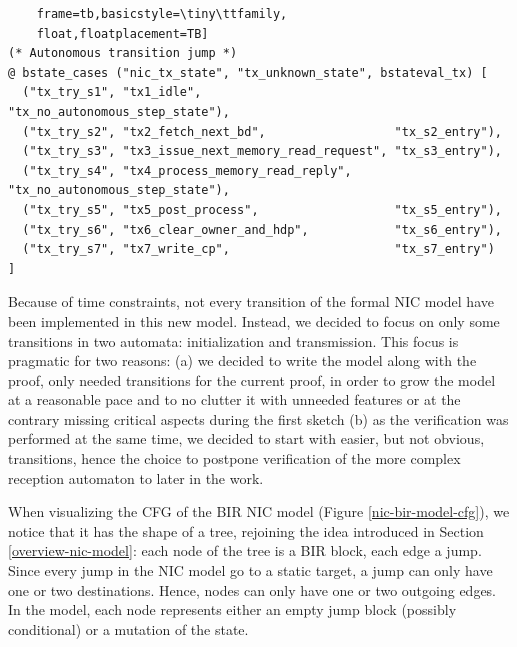 \documentclass{kththesis}
\begin{document}
{\begin{lstlisting}
    frame=tb,basicstyle=\tiny\ttfamily,
    float,floatplacement=TB]
(* Autonomous transition jump *)
@ bstate_cases ("nic_tx_state", "tx_unknown_state", bstateval_tx) [
  ("tx_try_s1", "tx1_idle",                           "tx_no_autonomous_step_state"),
  ("tx_try_s2", "tx2_fetch_next_bd",                  "tx_s2_entry"),
  ("tx_try_s3", "tx3_issue_next_memory_read_request", "tx_s3_entry"),
  ("tx_try_s4", "tx4_process_memory_read_reply",      "tx_no_autonomous_step_state"),
  ("tx_try_s5", "tx5_post_process",                   "tx_s5_entry"),
  ("tx_try_s6", "tx6_clear_owner_and_hdp",            "tx_s6_entry"),
  ("tx_try_s7", "tx7_write_cp",                       "tx_s7_entry")
]
\end{lstlisting}
%
Because of time constraints, not every transition of the formal NIC model have been implemented in this new model. Instead, we decided to focus on only some transitions in two automata: initialization and transmission. This focus is pragmatic for two reasons: (a) we decided to write the model along with the proof, only needed transitions for the current proof, in order to grow the model at a reasonable pace and to no clutter it with unneeded features or at the contrary missing critical aspects during the first sketch (b) as the verification was performed at the same time, we decided to start with easier, but not obvious, transitions, hence the choice to postpone verification of the more complex reception automaton to later in the work.

When visualizing the \gls{CFG} of the BIR NIC model (Figure \ref{nic-bir-model-cfg}), we notice that it has the shape of a tree, rejoining the idea introduced in Section \ref{overview-nic-model}: each node of the tree is a BIR block, each edge a jump. Since every jump in the NIC model go to a static target, a jump can only have one or two destinations. Hence, nodes can only have one or two outgoing edges. In the model, each node represents either an empty jump block (possibly conditional) or a mutation of the state.

}
\end{document}
